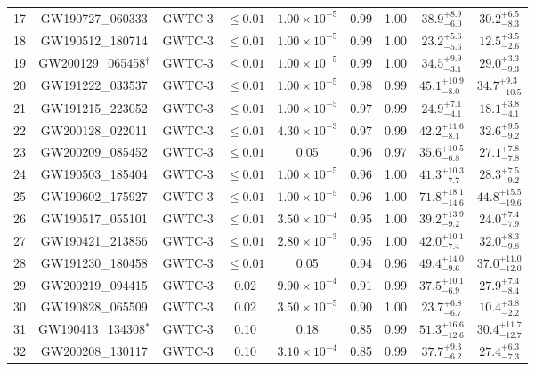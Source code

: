 \begin{table}[t]
\begin{threeparttable}
\begin{tabular}{!{\vrule width 1pt}lcccccccc!{\vrule width 1pt}}
17 & GW190727\_060333 & GWTC-3 & $\leq 0.01$ & $1.00 \times 10^{-5}$ & 0.99 & 1.00 & $38.9^{+8.9}_{-6.0}$ & $30.2^{+6.5}_{-8.3}$ \\
18 & GW190512\_180714 & GWTC-3 & $\leq 0.01$ & $1.00 \times 10^{-5}$ & 0.99 & 1.00 & $23.2^{+5.6}_{-5.6}$ & $12.5^{+3.5}_{-2.6}$ \\
19 & GW200129\_065458$^{\dagger}$ & GWTC-3 & $\leq 0.01$ & $1.00 \times 10^{-5}$ & 0.99 & 1.00  & $34.5^{+9.9}_{-3.1}$ & $29.0^{+3.3}_{-9.3}$ \\
20 & GW191222\_033537 & GWTC-3 & $\leq 0.01$ & $1.00 \times 10^{-5}$ & 0.98 & 0.99 & $45.1^{+10.9}_{-8.0}$ & $34.7^{+9.3}_{-10.5}$ \\
21 & GW191215\_223052 & GWTC-3 & $\leq 0.01$ & $1.00 \times 10^{-5}$ & 0.97 & 0.99 & $24.9^{+7.1}_{-4.1}$ & $18.1^{+3.8}_{-4.1}$ \\
22 & GW200128\_022011 & GWTC-3 & $\leq 0.01$ & $4.30 \times 10^{-3}$ & 0.97 & 0.99 & $42.2^{+11.6}_{-8.1}$ & $32.6^{+9.5}_{-9.2}$ \\
23 & GW200209\_085452 & GWTC-3 & $\leq 0.01$ & 0.05 & 0.96 & 0.97 & $35.6^{+10.5}_{-6.8}$ & $27.1^{+7.8}_{-7.8}$ \\
24 & GW190503\_185404 & GWTC-3 & $\leq 0.01$ & $1.00 \times 10^{-5}$ & 0.96 & 1.00 & $41.3^{+10.3}_{-7.7}$ & $28.3^{+7.5}_{-9.2}$ \\
25 & GW190602\_175927 & GWTC-3 & $\leq 0.01$ & $1.00 \times 10^{-5}$ & 0.96 & 1.00 & $71.8^{+18.1}_{-14.6}$ & $44.8^{+15.5}_{-19.6}$ \\
26 & GW190517\_055101 & GWTC-3 & $\leq 0.01$ & $3.50 \times 10^{-4}$ & 0.95 & 1.00 & $39.2^{+13.9}_{-9.2}$ & $24.0^{+7.4}_{-7.9}$ \\
27 & GW190421\_213856 & GWTC-3 & $\leq 0.01$ & $2.80 \times 10^{-3}$ & 0.95 & 1.00 & $42.0^{+10.1}_{-7.4}$ & $32.0^{+8.3}_{-9.8}$ \\
28 & GW191230\_180458 & GWTC-3 & $\leq 0.01$ & 0.05 & 0.94 & 0.96 & $49.4^{+14.0}_{-9.6}$ & $37.0^{+11.0}_{-12.0}$ \\
29 & GW200219\_094415 & GWTC-3 & 0.02 & $9.90 \times 10^{-4}$ & 0.91 & 0.99 & $37.5^{+10.1}_{-6.9}$ & $27.9^{+7.4}_{-8.4}$ \\
30 & GW190828\_065509 & GWTC-3 & 0.02 & $3.50 \times 10^{-5}$ & 0.90 & 1.00 & $23.7^{+6.8}_{-6.7}$ & $10.4^{+3.8}_{-2.2}$ \\
31 & GW190413\_134308$^{*}$ & GWTC-3 & 0.10 & 0.18 & 0.85 & 0.99 & $51.3^{+16.6}_{-12.6}$ & $30.4^{+11.7}_{-12.7}$ \\
32 & GW200208\_130117 & GWTC-3 & 0.10 & $3.10 \times 10^{-4}$ & 0.85 & 0.99 & $37.7^{+9.3}_{-6.2}$ & $27.4^{+6.3}_{-7.3}$ \\

\end{tabular}
\end{threeparttable}
\end{table}

